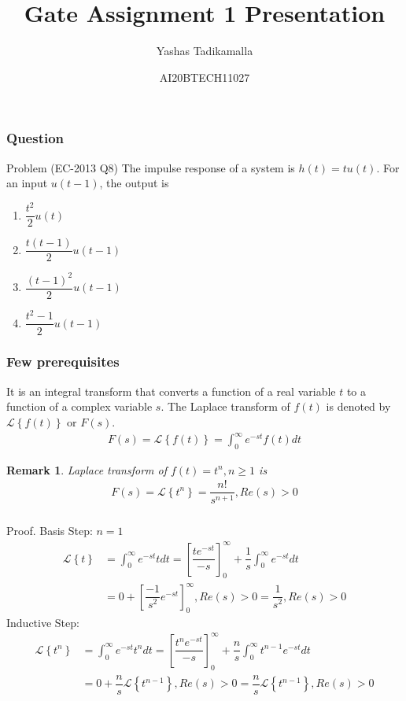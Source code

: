 \documentclass{beamer}
\title{Gate Assignment 1 Presentation}
\author{Yashas Tadikamalla}
\date{AI20BTECH11027}
\newtheorem*{remark}{Remark}
\providecommand{\sbrak}[1]{\ensuremath{{}\left[#1\right]}}
\providecommand{\cbrak}[1]{\ensuremath{\left\{#1\right\}}}
\begin{document}
\begin{frame}
\titlepage
\end{frame}
\begin{frame}
\frametitle{Question}
\begin{block}{Problem (EC-2013 Q8)}
The impulse response of a system is $h(t)=tu(t)$. For an input $u(t-1)$, the output is 
\begin{enumerate}
    \item $\dfrac{t^{2}}{2}u(t)$
    \item $\dfrac{t(t-1)}{2}u(t-1)$
    \item $\dfrac{(t-1)^{2}}{2}u(t-1)$
    \item $\dfrac{t^{2}-1}{2}u(t-1)$
\end{enumerate}
\end{block}
\end{frame}

\begin{frame}
\frametitle{Few prerequisites}
\begin{definition}
It is an integral transform that converts a function of a real variable $t$ to a function of a complex variable $s$. The Laplace transform of $f(t)$ is denoted by $\mathcal{L}\cbrak{f(t)}$ or $F(s)$.
\begin{align}
    F(s)=\mathcal{L}\cbrak{f(t)}=\int_{0}^{\infty}e^{-st}f(t)dt
\end{align}
\end{definition}
\begin{remark}
Laplace transform of $f(t)=t^n,n\geq1$ is
\begin{align}
    F(s)=\mathcal{L}\cbrak{t^n}=\dfrac{n!}{s^{n+1}},Re(s)>0
    \label{eq:t}
\end{align}
\end{remark}
\end{frame}


\begin{frame}
\frametitle{}
\begin{block}{Proof.}
Basis Step: $n=1$
\begin{align}
    \mathcal{L}\cbrak{t}&=\int_{0}^{\infty}e^{-st}tdt=\sbrak{\dfrac{te^{-st}}{-s}}_{0}^{\infty}+\dfrac{1}{s}\int_{0}^{\infty}e^{-st}dt\\
    &=0+\sbrak{\dfrac{-1}{s^2}e^{-st}}_{0}^{\infty},Re(s)>0=\dfrac{1}{s^2},Re(s)>0
\end{align}
Inductive Step:
\begin{align}
    \mathcal{L}\cbrak{t^n}&=\int_{0}^{\infty}e^{-st}t^ndt=\sbrak{\dfrac{t^{n}e^{-st}}{-s}}_{0}^{\infty}+\dfrac{n}{s}\int_{0}^{\infty}t^{n-1}e^{-st}dt\\
    &=0+\dfrac{n}{s}\mathcal{L}\cbrak{t^{n-1}},Re(s)>0=\dfrac{n}{s}\mathcal{L}\cbrak{t^{n-1}},Re(s)>0\label{eq:e}
\end{align}
\end{block}
\end{frame}
\end{document}
